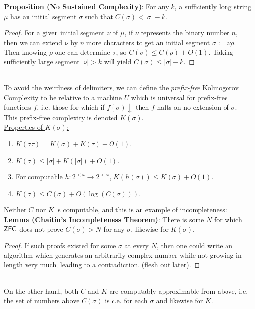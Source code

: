 \documentclass{amsart}
\DeclareMathOperator{\ZFC}{\sf{ZFC}}
\begin{document}
	\textbf{Proposition (No Sustained Complexity)}: For any $k$, a sufficiently long string $\mu$ has an initial segment $\sigma$ such that $C(\sigma) < |\sigma| - k$.
	\begin{proof}
		For a given initial segment $\nu$ of $\mu$, if $\nu$ represents the binary number $n$, then we can extend $\nu$ by $n$ more characters to get an initial segment $\sigma := \nu \rho$. Then knowing $\rho$ one can determine $\sigma$, so $C(\sigma)\leq C(\rho) + O(1)$. Taking sufficiently large segment $|\nu|>k$ will yield $C(\sigma)\leq |\sigma| - k$.
	\end{proof}\\
	
	To avoid the weirdness of delimiters, we can define the \textit{prefix-free} Kolmogorov Complexity to be relative to a machine $U$ which is universal for prefix-free functions $f$, i.e. those for which if $f(\sigma)\downarrow$ then $f$ halts on no extension of $\sigma$. This prefix-free complexity is denoted $K(\sigma)$. \\
	
	\underline{Properties of $K(\sigma)$:}
	\begin{enumerate}
		\item $K(\sigma \tau) = K(\sigma) + K(\tau) + O(1)$.
		\item $K(\sigma) \leq |\sigma| + K(|\sigma|) + O(1)$.
		\item For computable $h:2^{<\omega}\to 2^{<\omega}$, $K(h(\sigma)) \leq K(\sigma) + O(1)$.
		\item $K(\sigma) \leq C(\sigma) + O(\log(C(\sigma)))$.\\
	\end{enumerate}
	
	Neither $C$ nor $K$ is computable, and this is an example of incompleteness:\\
	
	\textbf{Lemma (Chaitin's Incompleteness Theorem)}: There is some $N$ for which $\ZFC$ does not prove $C(\sigma)>N$ for any $\sigma$, likewise for $K(\sigma)$.
	\begin{proof}
		If such proofs existed for some $\sigma$ at every $N$, then one could write an algorithm which generates an arbitrarily complex number while not growing in length very much, leading to a contradiction. (flesh out later).
	\end{proof}\\
	
	On the other hand, both $C$ and $K$ are computably approximable from above, i.e. the set of numbers above $C(\sigma)$ is c.e. for each $\sigma$ and likewise for $K$.\\
	
\end{document}
